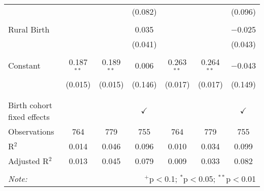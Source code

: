 \begin{table}[!htbp]
\begin{tabular}{@{\extracolsep{5pt}}lcccccc}
  &  &  & (0.082) &  &  & (0.096) \\ 
  & & & & & & \\ 
 Rural Birth &  &  & 0.035 &  &  & $-$0.025 \\ 
  &  &  & (0.041) &  &  & (0.043) \\ 
  & & & & & & \\ 
 Constant & 0.187$^{**}$ & 0.189$^{**}$ & 0.006 & 0.263$^{**}$ & 0.264$^{**}$ & $-$0.043 \\ 
  & (0.015) & (0.015) & (0.146) & (0.017) & (0.017) & (0.149) \\ 
  & & & & & & \\ 
\hline \\[-1.8ex] 
Birth cohort fixed effects &  &  & $\checkmark$ &  &  & $\checkmark$ \\ 
Observations & 764 & 779 & 755 & 764 & 779 & 755 \\ 
R$^{2}$ & 0.014 & 0.046 & 0.096 & 0.010 & 0.034 & 0.099 \\ 
Adjusted R$^{2}$ & 0.013 & 0.045 & 0.079 & 0.009 & 0.033 & 0.082 \\ 
\hline 
\hline \\[-1.8ex] 
\textit{Note:}  & \multicolumn{6}{r}{$^{+}$p$<$0.1; $^{*}$p$<$0.05; $^{**}$p$<$0.01}} \\ 
\end{tabular} 
\end{table} 
